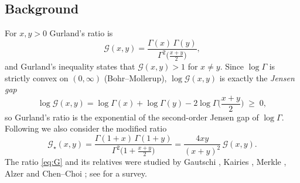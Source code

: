\documentclass[11pt,a4paper]{amsart}
\theoremstyle{definition}
\newcommand{\Gg}{\mathcal{G}}
\newcommand{\Gs}{\mathcal{G}_{\star}}
\begin{document}
\subsection{Background}
For $x,y>0$ Gurland's ratio \cite{Gurland56} is
\begin{equation}\label{eq:G}
  \Gg(x,y)=\frac{\Gamma(x)\,\Gamma(y)}{\Gamma^{2}\big(\frac{x+y}{2}\big)},
\end{equation}
and Gurland's inequality states that $\Gg(x,y)>1$ for $x\ne y$. Since $\log\Gamma$ is
strictly convex on $(0,\infty)$ (Bohr--Mollerup), $\log\Gg(x,y)$ is exactly the
\emph{Jensen gap}
\begin{equation}\label{eq:jensen}
  \log\Gg(x,y)=\log\Gamma(x)+\log\Gamma(y)-2\log\Gamma\Big(\frac{x+y}{2}\Big)\;\ge\;0,
\end{equation}
so Gurland's ratio is the exponential of the second-order Jensen gap of $\log\Gamma$.
Following \cite{Wisniewska25} we also consider the modified ratio
\begin{equation}\label{eq:Gs}
  \Gs(x,y)=\frac{\Gamma(1+x)\,\Gamma(1+y)}{\Gamma^{2}\big(1+\frac{x+y}{2}\big)}
            =\frac{4xy}{(x+y)^{2}}\,\Gg(x,y).
\end{equation}
The ratio \eqref{eq:G} and its relatives were studied by Gautschi \cite{Gautschi74},
Kairies \cite{Kairies83}, Merkle \cite{Merkle05}, Alzer \cite{Alzer01} and Chen--Choi
\cite{ChenChoi17}; see \cite{LaforgiaNatalini13} for a survey.
\end{document}
